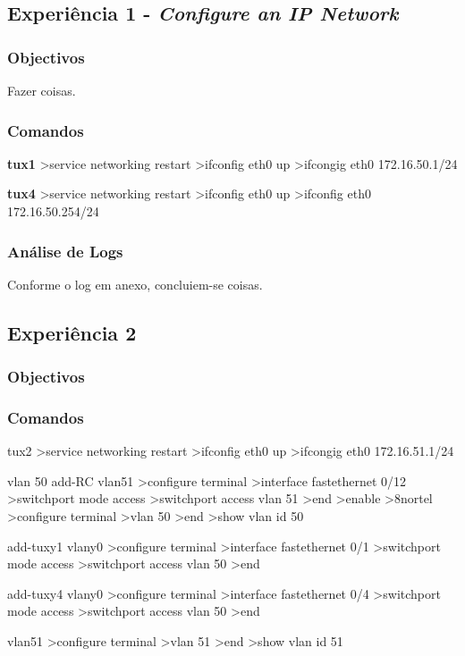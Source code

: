 \documentclass[a4paper,11pt]{article}
\begin{document}
\subsection{Experiência 1 - \textit{Configure an IP Network}}
\subsubsection{Objectivos}
Fazer coisas.

\subsubsection{Comandos}
\textbf{tux1}
>service networking restart
>ifconfig eth0 up
>ifcongig eth0 172.16.50.1/24

\textbf{tux4}
>service networking restart
>ifconfig eth0 up
>ifconfig eth0 172.16.50.254/24

\subsubsection{Análise de Logs}
Conforme o log em anexo, concluiem-se coisas.

\subsection{Experiência 2}
\subsubsection{Objectivos}

\subsubsection{Comandos}
tux2
>service networking restart
>ifconfig eth0 up
>ifcongig eth0 172.16.51.1/24

vlan 50
add-RC vlan51
>configure terminal
>interface fastethernet 0/12
>switchport mode access
>switchport access vlan 51
>end
>enable
>8nortel
>configure terminal
>vlan 50
>end
>show vlan id 50

add-tuxy1 vlany0
>configure terminal
>interface fastethernet 0/1
>switchport mode access
>switchport access vlan 50
>end

add-tuxy4 vlany0
>configure terminal
>interface fastethernet 0/4
>switchport mode access
>switchport access vlan 50
>end


vlan51
>configure terminal
>vlan 51
>end
>show vlan id 51
\end{document}
